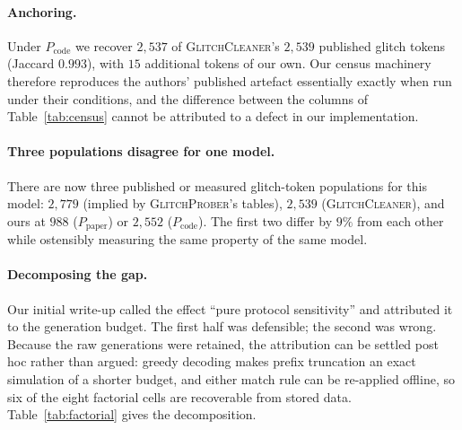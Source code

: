 \documentclass[11pt,a4paper]{article}
\newcommand{\gp}{\textsc{GlitchProber}}
\newcommand{\gc}{\textsc{GlitchCleaner}}
\newcommand{\Ppaper}{$P_{\mathrm{paper}}$}
\newcommand{\Pcode}{$P_{\mathrm{code}}$}
\begin{document}
\paragraph{Anchoring.} Under \Pcode{} we recover $2{,}537$ of \gc{}'s $2{,}539$
published glitch tokens (Jaccard $0.993$), with $15$ additional tokens of our own.
Our census machinery therefore reproduces the authors' published artefact
essentially exactly when run under their conditions, and the difference between
the columns of Table~\ref{tab:census} cannot be attributed to a defect in our
implementation.

\paragraph{Three populations disagree for one model.} There are now three
published or measured glitch-token populations for this model: $2{,}779$ (implied
by \gp{}'s tables), $2{,}539$ (\gc{}), and ours at $988$ (\Ppaper{}) or $2{,}552$
(\Pcode{}). The first two differ by $9\%$ from each other while ostensibly
measuring the same property of the same model.

\paragraph{Decomposing the gap.} Our initial write-up called the effect ``pure
protocol sensitivity'' and attributed it to the generation budget. The first half
was defensible; the second was wrong. Because the raw generations were retained,
the attribution can be settled post hoc rather than argued: greedy decoding makes
prefix truncation an exact simulation of a shorter budget, and either match rule
can be re-applied offline, so six of the eight factorial cells are recoverable
from stored data. Table~\ref{tab:factorial} gives the decomposition.
\end{document}
